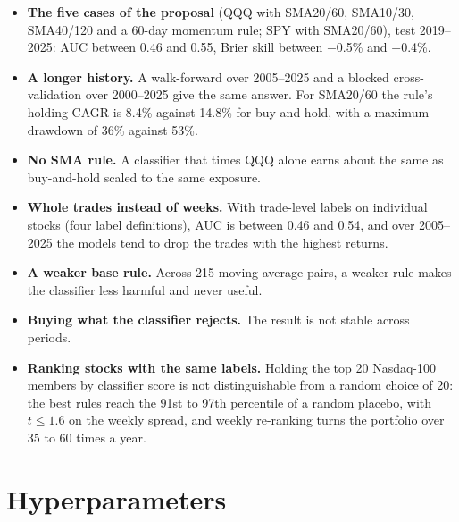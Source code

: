 \documentclass[11pt]{article}
\providecommand{\tightlist}{\setlength{\itemsep}{2pt}\setlength{\parskip}{0pt}}
\begin{document}
\begin{itemize}
\tightlist
\item
  \textbf{The five cases of the proposal} (QQQ with SMA20/60, SMA10/30, SMA40/120 and a 60-day momentum rule; SPY with SMA20/60), test 2019--2025: AUC between 0.46 and 0.55, Brier skill between $-$0.5\% and +0.4\%.
\item
  \textbf{A longer history.} A walk-forward over 2005--2025 and a blocked cross-validation over 2000--2025 give the same answer. For SMA20/60 the rule's holding CAGR is 8.4\% against 14.8\% for buy-and-hold, with a maximum drawdown of 36\% against 53\%.
\item
  \textbf{No SMA rule.} A classifier that times QQQ alone earns about the same as buy-and-hold scaled to the same exposure.
\item
  \textbf{Whole trades instead of weeks.} With trade-level labels on individual stocks (four label definitions), AUC is between 0.46 and 0.54, and over 2005--2025 the models tend to drop the trades with the highest returns.
\item
  \textbf{A weaker base rule.} Across 215 moving-average pairs, a weaker rule makes the classifier less harmful and never useful.
\item
  \textbf{Buying what the classifier rejects.} The result is not stable across periods.
\item
  \textbf{Ranking stocks with the same labels.} Holding the top 20 Nasdaq-100 members by classifier score is not distinguishable from a random choice of 20: the best rules reach the 91st to 97th percentile of a random placebo, with \(t \le 1.6\) on the weekly spread, and weekly re-ranking turns the portfolio over 35 to 60 times a year.
\end{itemize}

\section{Hyperparameters}
\end{document}

